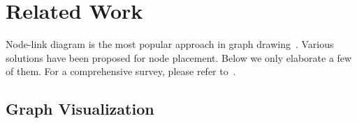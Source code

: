 \section{Related Work}\label{sec:relatedwork}
{Node-link diagram is the most popular approach in graph drawing~\cite{DBLP:conf/dac/FiskI65}. Various solutions have been proposed for node placement.
Below we only elaborate a few of them. For a comprehensive survey, please refer to~\cite{DBLP:journals/ivs/CheongS20, DBLP:journals/csur/DiazPS02, DBLP:journals/ivs/GibsonFV13, DBLP:journals/tvcg/HermanMM00}.}

\subsection{Graph Visualization}
